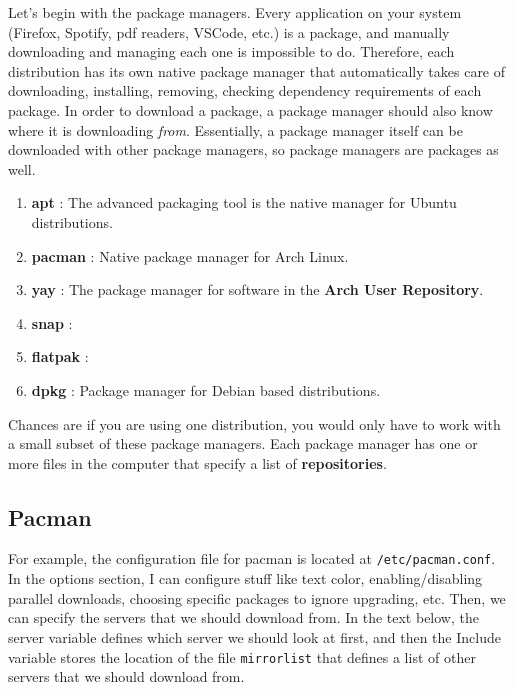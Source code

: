 \documentclass{article}
\begin{document}
  Let's begin with the package managers. Every application on your system (Firefox, Spotify, pdf readers, VSCode, etc.) is a package, and manually downloading and managing each one is impossible to do. Therefore, each distribution has its own native package manager that automatically takes care of downloading, installing, removing, checking dependency requirements of each package. In order to download a package, a package manager should also know where it is downloading \textit{from}. Essentially, a package manager itself can be downloaded with other package managers, so package managers are packages as well. 
  
  \begin{enumerate}
    \item \textbf{apt} : The advanced packaging tool is the native manager for Ubuntu distributions. 
    \item \textbf{pacman} : Native package manager for Arch Linux. 
    \item \textbf{yay} : The package manager for software in the \textbf{Arch User Repository}. 
    \item \textbf{snap} : 
    \item \textbf{flatpak} : 
    \item \textbf{dpkg} : Package manager for Debian based distributions. 
  \end{enumerate}

  Chances are if you are using one distribution, you would only have to work with a small subset of these package managers. Each package manager has one or more files in the computer that specify a list of \textbf{repositories}. 

  \subsection{Pacman}

    For example, the configuration file for pacman is located at \texttt{/etc/pacman.conf}. In the options section, I can configure stuff like text color, enabling/disabling parallel downloads, choosing specific packages to ignore upgrading, etc. Then, we can specify the servers that we should download from. In the text below, the server variable defines which server we should look at first, and then the Include variable stores the location of the file \texttt{mirrorlist} that defines a list of other servers that we should download from. 
    
\end{document}
